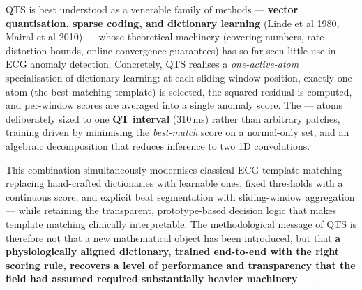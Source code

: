\documentclass{iopjournal}
\begin{document}
QTS is best understood as  a venerable family of methods --- \textbf{vector quantisation, sparse coding, and dictionary learning} (Linde et al 1980,  Mairal et al 2010) --- whose theoretical machinery (covering numbers, rate-distortion bounds, online convergence guarantees) has so far seen little use in ECG anomaly detection. Concretely, QTS realises a \emph{one-active-atom} specialisation of dictionary learning: at each sliding-window position, exactly one atom (the best-matching template) is selected, the squared residual is computed, and per-window scores are averaged into a single anomaly score. The  --- atoms deliberately sized to one \textbf{QT interval} (310\,ms) rather than arbitrary patches, training driven by minimising the \emph{best-match} score on a normal-only set, and an algebraic decomposition that reduces inference to two 1D convolutions.

This combination simultaneously modernises classical ECG template matching  --- replacing hand-crafted dictionaries with learnable ones, fixed thresholds with a continuous score, and explicit beat segmentation with sliding-window aggregation --- while retaining the transparent, prototype-based decision logic that makes template matching clinically interpretable. The methodological message of QTS is therefore not that a new mathematical object has been introduced, but that \textbf{a physiologically aligned dictionary, trained end-to-end with the right scoring rule, recovers a level of performance and transparency that the field had assumed required substantially heavier machinery} --- .
\end{document}
